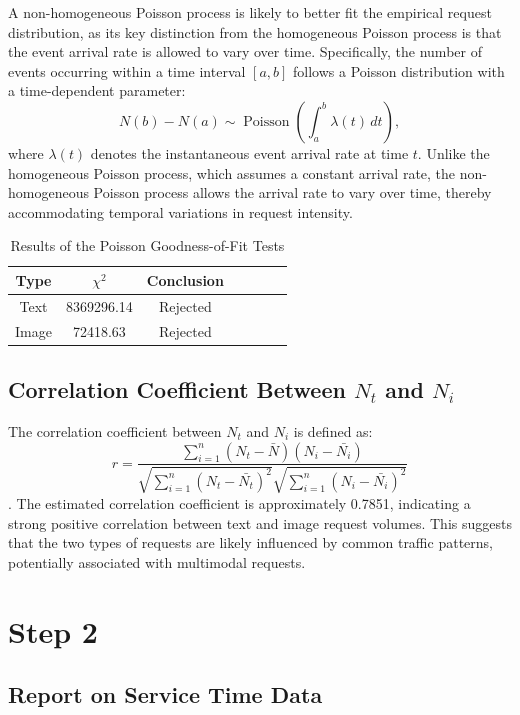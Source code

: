 \documentclass[10pt,a4paper]{article}
\begin{document}
	A non-homogeneous Poisson process is likely to better fit the empirical request distribution, as its key distinction from the homogeneous Poisson process is that the event arrival rate is allowed to vary over time. Specifically, the number of events occurring within a time interval $[a,b]$ follows a Poisson distribution with a time-dependent parameter:
	\[
	N(b)-N(a) \sim \operatorname{Poisson}\left(\int_a^b \lambda(t)\,dt\right),
	\]
	where $\lambda(t)$ denotes the instantaneous event arrival rate at time $t$. Unlike the homogeneous Poisson process, which assumes a constant arrival rate, the non-homogeneous Poisson process allows the arrival rate to vary over time, thereby accommodating temporal variations in request intensity.
	
	\begin{table}[H]
		\centering
		\caption{Results of the Poisson Goodness-of-Fit Tests}
		\label{tab:poisson_goodness-of-fit}
		\begin{tabular}{ccccccc}
			\hline
			Type & $ \chi^2 $ & Conclusion  \\
			\hline
			Text  & 8369296.14 & Rejected  \\
			Image & 72418.63 & Rejected  \\
			\hline
		\end{tabular}
	\end{table}
	
	\subsection{Correlation Coefficient Between $N_t$ and $N_i$}
	The correlation coefficient between $N_t$ and $N_i$ is
	defined as:
	\[
	r = \frac{\sum_{i=1}^{n}(N_t-\bar{N})(N_i-\bar{N_i})}
	{\sqrt{\sum_{i=1}^{n}(N_t-\bar{N_t})^2}\sqrt{\sum_{i=1}^{n}(N_i-\bar{N_i})^2}}
	\].
	The estimated correlation coefficient is approximately 0.7851,
	indicating a strong positive correlation between text and image
	request volumes. This suggests that the two types of requests
	are likely influenced by common traffic patterns, potentially
	associated with multimodal requests.
	
	
	
	
	\section{Step 2}
	
	\subsection{Report on Service Time Data}
	
\end{document}
